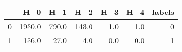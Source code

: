 \begin{tabular}{lrrrrrr}
\toprule
{} &     H\_0 &    H\_1 &    H\_2 &  H\_3 &  H\_4 &  labels \\
\midrule
0 &  1930.0 &  790.0 &  143.0 &  1.0 &  1.0 &       0 \\
1 &   136.0 &   27.0 &    4.0 &  0.0 &  0.0 &       1 \\
\bottomrule
\end{tabular}
